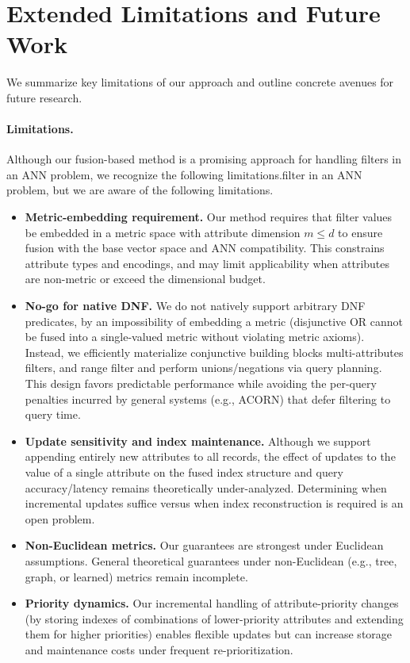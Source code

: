 \documentclass[numbers,sort]{article}
\begin{document}
\section{Extended Limitations and Future Work}
\label{sec:limitations-future}

We summarize key limitations of our approach and outline concrete avenues for future research.

\paragraph{Limitations.} Although our fusion-based method is a promising approach for handling filters in an ANN problem, we recognize the following limitations.filter in an ANN problem, but we are aware of the following limitations.
\begin{itemize}[leftmargin=*, nosep]
    \item \textbf{Metric-embedding requirement.} Our method requires that filter values be embedded in a metric space with attribute dimension \(m \le d\) to ensure fusion with the base vector space and ANN compatibility. This constrains attribute types and encodings, and may limit applicability when attributes are non-metric or exceed the dimensional budget.
    \item \textbf{No-go for native DNF.} We do not natively support arbitrary DNF predicates, by an impossibility of embedding a metric (disjunctive OR cannot be fused into a single-valued metric without violating metric axioms). Instead, we efficiently materialize conjunctive building blocks multi-attributes filters, and range filter and perform unions/negations via query planning. This design favors predictable performance while avoiding the per-query penalties incurred by general systems (e.g., ACORN) that defer filtering to query time.
    \item \textbf{Update sensitivity and index maintenance.} Although we support appending entirely new attributes to all records, the effect of updates to the value of a single attribute on the fused index structure and query accuracy/latency remains theoretically under-analyzed. Determining when incremental updates suffice versus when index reconstruction is required is an open problem.
    \item \textbf{Non-Euclidean metrics.} Our guarantees are strongest under Euclidean assumptions. General theoretical guarantees under non-Euclidean (e.g., tree, graph, or learned) metrics remain incomplete.
    \item \textbf{Priority dynamics.} Our incremental handling of attribute-priority changes (by storing indexes of combinations of lower-priority attributes and extending them for higher priorities) enables flexible updates but can increase storage and maintenance costs under frequent re-prioritization.
\end{itemize}
\end{document}
